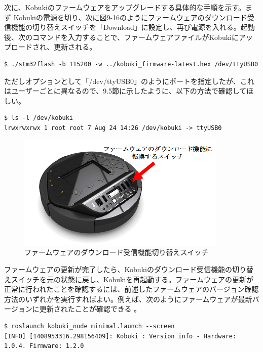 \begin{itemize}
次に、Kobukiのファームウェアをアップグレードする具体的な手順を示す。まず   Kobukiの電源を切り、次に図9-16のようにファームウェアのダウンロード受信機能の切り替えスイッチを「Download」に設定し、再び電源を入れる。起動後、次のコマンドを入力することで、ファームウェアファイルがKobukiにアップロードされ、更新される。

\begin{lstlisting}[language=ROS]
$ ./stm32flash -b 115200 -w ../kobuki_firmware-latest.hex /dev/ttyUSB0
\end{lstlisting}

ただしオプションとして「/dev/ttyUSB0」のようにポートを指定したが、これはユーザーごとに異なるので、9.5節に示したように、以下の方法で確認してほしい。

\begin{lstlisting}[language=ROS]
$ ls -l /dev/kobuki
lrwxrwxrwx 1 root root 7 Aug 24 14:26 /dev/kobuki -> ttyUSB0
\end{lstlisting}

\begin{figure}[htp]
  \centering
  \includegraphics[width=10cm]{pictures/chapter9/pic_09_16.png}
  \caption{ファームウェアのダウンロード受信機能切り替えスイッチ}
\end{figure}

ファームウェアの更新が完了したら、Kobukiのダウンロード受信機能の切り替えスイッチを元の状態に戻し、Kobukiを再起動する。ファームウェアの更新が正常に行われたことを確認するには、前述したファームウェアのバージョン確認方法のいずれかを実行すればよい。例えば、次のようにファームウェアが最新バージョンに更新されたことが確認できる  。

\begin{lstlisting}[language=ROS]
$ roslaunch kobuki_node minimal.launch --screen
[INFO] [1408953316.298156409]: Kobuki : Version info - Hardware: 1.0.4. Firmware: 1.2.0
\end{lstlisting}


\end{itemize}

